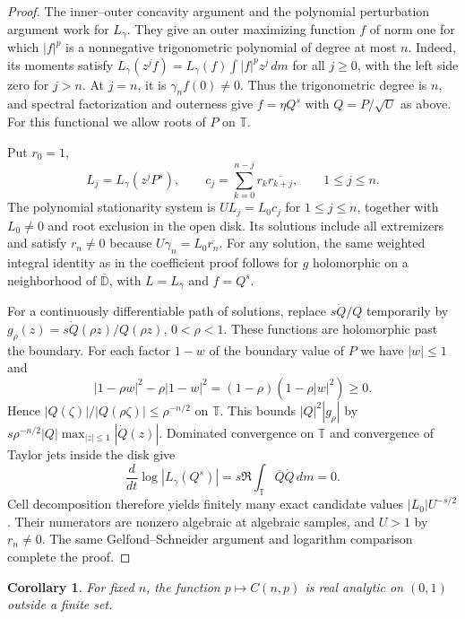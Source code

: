 \documentclass[11pt]{article}
\newtheorem{corollary}[theorem]{Corollary}
\newcommand{\D}{\mathbb D}
\newcommand{\T}{\mathbb T}
\begin{document}
\begin{proof}
The inner--outer concavity argument and the polynomial perturbation
argument work for \(L_\gamma\). They give an outer maximizing
function \(f\) of norm one for which \(|f|^p\) is a nonnegative
trigonometric polynomial of degree at most \(n\). Indeed, its
moments satisfy \(L_\gamma(z^j f)=L_\gamma(f)\int|f|^p z^j\,dm\)
for all \(j\geq0\), with the left side zero for \(j>n\).
At \(j=n\), it is \(\gamma_n f(0)\ne0\). Thus the trigonometric
degree is \(n\), and spectral factorization and outerness give
\(f=\eta Q^s\) with \(Q=P/\sqrt U\) as above. For this functional
we allow roots of \(P\) on \(\T\).

Put \(r_0=1\),
\[
 L_j=L_\gamma(z^jP^s),\qquad
 c_j=\sum_{k=0}^{n-j}r_k\overline{r_{k+j}},\qquad 1\leq j\leq n .
\]
The polynomial stationarity system is \(UL_j=L_0c_j\) for
\(1\leq j\leq n\), together with \(L_0\ne0\) and root exclusion
in the open disk. Its solutions include all extremizers and satisfy
\(r_n\ne0\) because \(U\gamma_n=L_0\overline{r_n}\).
For any solution, the same weighted integral identity as in the
coefficient proof follows for \(g\) holomorphic on a neighborhood
of \(\overline{\D}\), with \(L=L_\gamma\) and \(f=Q^s\).

For a continuously differentiable path of solutions, replace
\(s\dot Q/Q\) temporarily by
\(g_\rho(z)=s\dot Q(\rho z)/Q(\rho z)\), \(0<\rho<1\).
These functions are holomorphic past the boundary.
For each factor \(1-w\) of the boundary value of \(P\) we have
\(|w|\leq1\) and
\[
 |1-\rho w|^2-\rho|1-w|^2
   =(1-\rho)(1-\rho|w|^2)\geq0 .
\]
Hence \(|Q(\zeta)|/|Q(\rho\zeta)|\leq\rho^{-n/2}\) on \(\T\).
This bounds \(|Q|^2|g_\rho|\) by
\(s\rho^{-n/2}|Q|\max_{|z|\leq1}|\dot Q(z)|\).
Dominated convergence on \(\T\) and convergence of Taylor jets
inside the disk give
\[
 \frac{d}{dt}\log|L_\gamma(Q^s)|
   =s\Re\int_{\T}\overline Q\dot Q\,dm=0 .
\]
Cell decomposition therefore yields finitely many exact candidate
values \(|L_0|U^{-s/2}\). Their numerators are nonzero algebraic
at algebraic samples, and \(U>1\) by \(r_n\ne0\).
The same Gelfond--Schneider argument and logarithm comparison
complete the proof.
\end{proof}

\begin{corollary}\label{cor:hardy-phase-finite}
For fixed \(n\), the function \(p\mapsto C(n,p)\) is real analytic
on \((0,1)\) outside a finite set.
\end{corollary}
\end{document}
